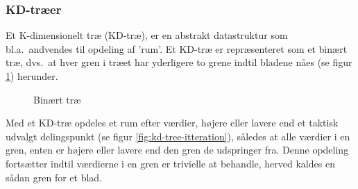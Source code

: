 \subsubsection{KD-træer}
\label{sec:kdtree}

Et K-dimensionelt træ (KD-træ), er en abstrakt datastruktur som bl.a.\ andvendes til opdeling af 'rum'. Et KD-træ er repræsenteret som et binært træ, dvs.\ at
hver gren i træet har yderligere to grene indtil bladene nåes (se figur \ref{fig:binary-tree}) herunder. 

\begin{figure}[H]
  \centering
  \caption{Binært træ}
  \label{fig:binary-tree}
\end{figure}

Med et KD-træ opdeles et rum efter værdier, højere eller lavere end et taktisk udvalgt delingspunkt (se figur \ref{fig:kd-tree-itteration}),
således at alle værdier i en gren, enten er højere eller lavere end den gren de udspringer fra. Denne  opdeling fortsætter indtil værdierne i en gren er trivielle at behandle, herved kaldes en sådan gren for et blad.

